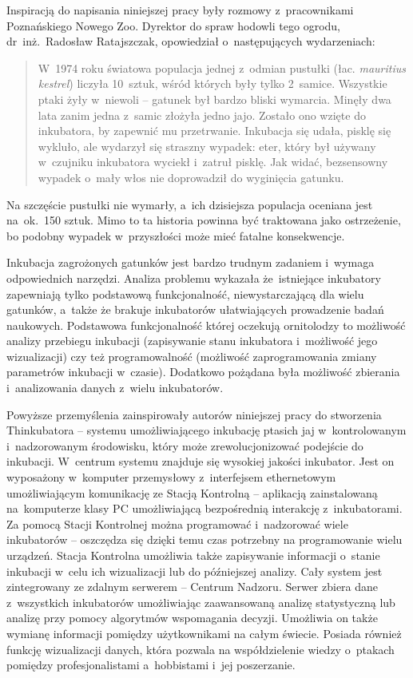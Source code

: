 Inspiracją do napisania niniejszej pracy były rozmowy z~pracownikami Poznańskiego
Nowego Zoo. Dyrektor do spraw hodowli tego ogrodu, dr~inż.~Radosław Ratajszczak,
opowiedział o~następujących wydarzeniach:
\begin{quote}
	 W~1974 roku światowa populacja jednej z~odmian pustułki (łac. \emph{mauritius
	 kestrel}) liczyła 10~sztuk, wśród których były tylko 2~samice. Wszystkie
	 ptaki żyły w~niewoli -- gatunek był bardzo bliski wymarcia. Minęły dwa lata
	 zanim jedna z~samic złożyła jedno jajo. Zostało ono wzięte do inkubatora, by
	 zapewnić mu przetrwanie. Inkubacja się udała, pisklę się wykluło, ale
	 wydarzył się straszny wypadek: eter, który był używany w~czujniku inkubatora
	 wyciekł i~zatruł pisklę. Jak widać, bezsensowny wypadek o~mały włos nie
	 doprowadził do wyginięcia gatunku.
\end{quote}
Na szczęście pustułki nie wymarły, a~ich dzisiejsza populacja oceniana jest
na~ok.~150 sztuk. Mimo to ta historia powinna być traktowana jako
ostrzeżenie, bo podobny wypadek w~przyszłości może mieć fatalne konsekwencje.

Inkubacja zagrożonych gatunków jest bardzo trudnym zadaniem i~wymaga
odpowiednich narzędzi. Analiza problemu wykazała że~istniejące inkubatory
zapewniają tylko podstawową funkcjonalność, niewystarczającą dla wielu
gatunków, a~także że brakuje inkubatorów ułatwiających prowadzenie badań
naukowych. Podstawowa funkcjonalność której oczekują ornitolodzy to możliwość
analizy przebiegu inkubacji (zapisywanie stanu inkubatora i~możliwość jego
wizualizacji) czy też programowalność (możliwość zaprogramowania zmiany
parametrów inkubacji w~czasie). Dodatkowo pożądana była możliwość zbierania
i~analizowania danych z~wielu inkubatorów.

Powyższe przemyślenia zainspirowały autorów niniejszej pracy do stworzenia
Thinkubatora -- systemu umożliwiającego inkubację ptasich jaj w~kontrolowanym
i~nadzorowanym środowisku, który może zrewolucjonizować podejście do inkubacji.
W~centrum systemu znajduje się wysokiej jakości inkubator. Jest on wyposażony
w~komputer przemysłowy z~interfejsem ethernetowym umożliwiającym komunikację ze
Stacją Kontrolną -- aplikacją zainstalowaną na~komputerze klasy PC umożliwiającą
bezpośrednią interakcję z~inkubatorami. Za pomocą Stacji Kontrolnej można
programować i~nadzorować wiele inkubatorów -- oszczędza się dzięki temu czas
potrzebny na programowanie wielu urządzeń. Stacja Kontrolna umożliwia także
zapisywanie informacji o~stanie inkubacji w~celu ich wizualizacji lub do
późniejszej analizy. Cały system jest zintegrowany ze zdalnym serwerem --
Centrum Nadzoru. Serwer zbiera dane z~wszystkich inkubatorów umożliwiając
zaawansowaną analizę statystyczną lub analizę przy pomocy algorytmów wspomagania
decyzji. Umożliwia on także wymianę informacji pomiędzy użytkownikami na całym
świecie. Posiada również funkcję wizualizacji danych, która pozwala na
współdzielenie wiedzy o~ptakach pomiędzy profesjonalistami a~hobbistami i~jej
poszerzanie.

